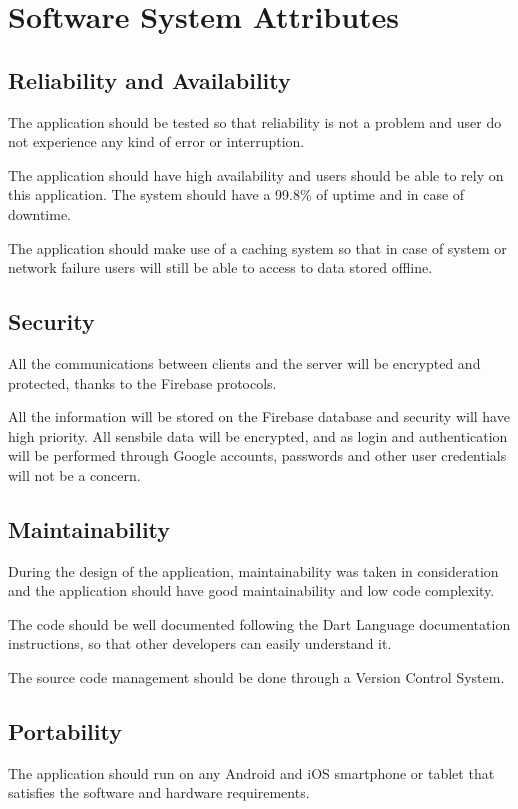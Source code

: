\section{Software System Attributes}

\subsection{Reliability and Availability}
The application should  be tested so that reliability is not a problem and user do not experience any kind of error or interruption.

The application should have high availability and users should be able to rely on this application.
The system should have a 99.8\% of uptime and in case of downtime. 

The application should make use of a caching system so that in case of system or network failure users will still be able to access to data stored offline.

\subsection{Security}
All the communications between clients and the server will be encrypted and protected, thanks to the Firebase protocols.

All the information will be stored on the Firebase database and security will have high priority. All sensbile data will be encrypted,
and as login and authentication will be performed through Google accounts, passwords and other user credentials will not be a concern.

\subsection{Maintainability}
During the design of the application, maintainability was taken in consideration and the application should have good maintainability and low code complexity.

The code should be well documented following the Dart Language documentation instructions, so that other developers can easily understand it.

The source code management should be done through a Version Control System.


\subsection{Portability}
The application should run on any Android and iOS smartphone or 
tablet that satisfies the software and hardware requirements.